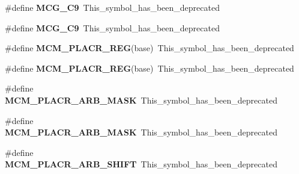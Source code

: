 \begin{DoxyCompactItemize}
\item 
\#define {\bfseries M\+C\+G\+\_\+\+C9}~This\+\_\+symbol\+\_\+has\+\_\+been\+\_\+deprecated\hypertarget{group__Backward__Compatibility__Symbols_ga40ae99ab2fbda74612a8f3f6bab361e0}{}\label{group__Backward__Compatibility__Symbols_ga40ae99ab2fbda74612a8f3f6bab361e0}

\item 
\#define {\bfseries M\+C\+G\+\_\+\+C9}~This\+\_\+symbol\+\_\+has\+\_\+been\+\_\+deprecated\hypertarget{group__Backward__Compatibility__Symbols_ga40ae99ab2fbda74612a8f3f6bab361e0}{}\label{group__Backward__Compatibility__Symbols_ga40ae99ab2fbda74612a8f3f6bab361e0}

\item 
\#define {\bfseries M\+C\+M\+\_\+\+P\+L\+A\+C\+R\+\_\+\+R\+EG}(base)~This\+\_\+symbol\+\_\+has\+\_\+been\+\_\+deprecated\hypertarget{group__Backward__Compatibility__Symbols_ga7352403c798ebab30d2179fa9130011a}{}\label{group__Backward__Compatibility__Symbols_ga7352403c798ebab30d2179fa9130011a}

\item 
\#define {\bfseries M\+C\+M\+\_\+\+P\+L\+A\+C\+R\+\_\+\+R\+EG}(base)~This\+\_\+symbol\+\_\+has\+\_\+been\+\_\+deprecated\hypertarget{group__Backward__Compatibility__Symbols_ga7352403c798ebab30d2179fa9130011a}{}\label{group__Backward__Compatibility__Symbols_ga7352403c798ebab30d2179fa9130011a}

\item 
\#define {\bfseries M\+C\+M\+\_\+\+P\+L\+A\+C\+R\+\_\+\+A\+R\+B\+\_\+\+M\+A\+SK}~This\+\_\+symbol\+\_\+has\+\_\+been\+\_\+deprecated\hypertarget{group__Backward__Compatibility__Symbols_gaeea6e96c143304d5bb05ea7fc403efc3}{}\label{group__Backward__Compatibility__Symbols_gaeea6e96c143304d5bb05ea7fc403efc3}

\item 
\#define {\bfseries M\+C\+M\+\_\+\+P\+L\+A\+C\+R\+\_\+\+A\+R\+B\+\_\+\+M\+A\+SK}~This\+\_\+symbol\+\_\+has\+\_\+been\+\_\+deprecated\hypertarget{group__Backward__Compatibility__Symbols_gaeea6e96c143304d5bb05ea7fc403efc3}{}\label{group__Backward__Compatibility__Symbols_gaeea6e96c143304d5bb05ea7fc403efc3}

\item 
\#define {\bfseries M\+C\+M\+\_\+\+P\+L\+A\+C\+R\+\_\+\+A\+R\+B\+\_\+\+S\+H\+I\+FT}~This\+\_\+symbol\+\_\+has\+\_\+been\+\_\+deprecated\hypertarget{group__Backward__Compatibility__Symbols_ga074aa7cf18e97a20994af9c9f1151873}{}\label{group__Backward__Compatibility__Symbols_ga074aa7cf18e97a20994af9c9f1151873}


\end{DoxyCompactItemize}
